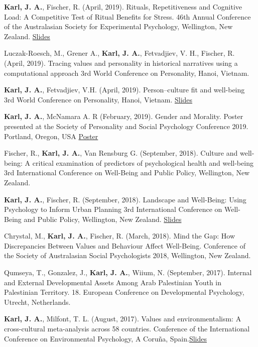 \documentclass[11pt]{article} %
\begin{document}
\begin{hangparas}{2em}{1}

\textbf{Karl, J. A.}, Fischer, R. (April, 2019). Rituals, Repetitiveness and Cognitive Load: A Competitive Test of Ritual Benefits for Stress. 46th Annual Conference of the Australasian Society for Experimental Psychology, Wellington, New Zealand. \href{https://osf.io/d2vgs/?view_only=672c064ce9f64c729734c33404b0e95c}{Slides}


Luczak-Roesch, M., Grener A., \textbf{Karl, J. A.}, Fetvadjiev, V. H., Fischer, R. (April, 2019). Tracing values and personality in historical narratives using a computational approach 3rd World Conference on Personality, Hanoi, Vietnam.

\textbf{Karl, J. A.}, Fetvadjiev, V.H. (April, 2019). Person–culture fit and well-being 3rd World Conference on Personality, Hanoi, Vietnam.
\href{https://osf.io/jqr35/?view_only=b30caac7fc904903b91e7faeeafa0841}{Slides}

\textbf{Karl, J. A.}, McNamara A. R (February, 2019). Gender and Morality. Poster presented at the Society of Personality and Social Psychology Conference 2019. Portland, Oregon, USA \href{https://osf.io/5xgda/?view_only=1fa31b2b2ccf4ca7a4acb75ff0f7856b}{Poster}

Fischer, R., \textbf{Karl, J. A.}, Van Rensburg G. (September, 2018). Culture and well-being: A critical examination of predictors of psychological health and well-being 3rd International Conference on Well-Being and Public Policy, Wellington, New Zealand.

\textbf{Karl, J. A.}, Fischer, R. (September, 2018). Landscape and Well-Being: Using Psychology to Inform Urban Planning 3rd International Conference on Well-Being and Public Policy, Wellington, New Zealand. \href{https://osf.io/yvpq3/?view_only=1486c420e77d49e4a552796f745787b7}{Slides}

Chrystal, M., \textbf{Karl, J. A.}, Fischer, R. (March, 2018). Mind the Gap: How Discrepancies Between Values and Behaviour Affect Well-Being. Conference of the Society of Australasian Social Psychologists 2018, Wellington, New Zealand.

Qumseya, T., Gonzalez, J., \textbf{Karl, J. A.}, Wiium, N. (September, 2017). Internal and External Developmental Assets Among Arab Palestinian Youth in Palestinian Territory. 18. European Conference on Developmental Psychology, Utrecht, Netherlands.

\textbf{Karl, J. A.}, Milfont, T. L. (August, 2017). Values and environmentalism: A cross-cultural meta-analysis across 58 countries. Conference of the International Conference on Environmental Psychology, A Coruña, Spain.\href{https://osf.io/nqu9j/?view_only=2965f88b9aed43df9aa2318f112475f1}{Slides}


\end{hangparas}
\end{document}
